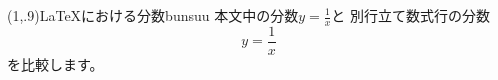 \begin{showProg}(1,.9){\LaTeX における分数}{bunsuu}
本文中の分数$y=\frac1x$と
別行立て数式行の分数
\[
  y = \frac1x
\]
を比較します。
\end{showProg}
